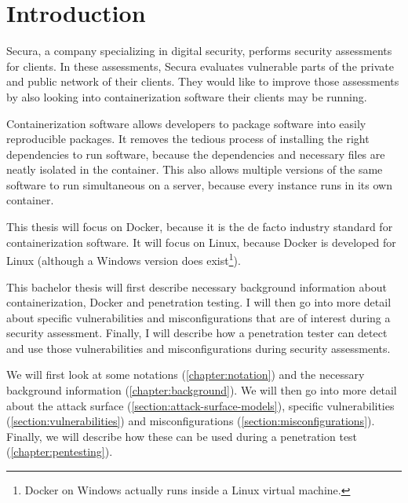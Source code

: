 \chapter{Introduction}
Secura, a company specializing in digital security, performs security assessments for clients. In these assessments, Secura evaluates vulnerable parts of the private and public network of their clients. They would like to improve those assessments by also looking into containerization software their clients may be running.

\hfill

Containerization software allows developers to package software into easily reproducible packages.
It removes the tedious process of installing the right dependencies to run software, because the dependencies and necessary files are neatly isolated in the container. This also allows multiple versions of the same software to run simultaneous on a server, because every instance runs in its own container.

\hfill

This thesis will focus on Docker, because it is the de facto industry standard for containerization software. It will focus on Linux, because Docker is developed for Linux (although a Windows version does exist\footnote{Docker on Windows actually runs inside a Linux virtual machine.}).

\hfill

This bachelor thesis will first describe necessary background information about containerization, Docker and penetration testing. I will then go into more detail about specific vulnerabilities and misconfigurations that are of interest during a security assessment. Finally, I will describe how a penetration tester can detect and use those vulnerabilities and misconfigurations during security assessments.

We will first look at some notations (\autoref{chapter:notation}) and the necessary background information (\autoref{chapter:background}). We will then go into more detail about the attack surface (\autoref{section:attack-surface-models}), specific vulnerabilities (\autoref{section:vulnerabilities}) and misconfigurations (\autoref{section:misconfigurations}). Finally, we will describe how these can be used during a penetration test (\autoref{chapter:pentesting}).
